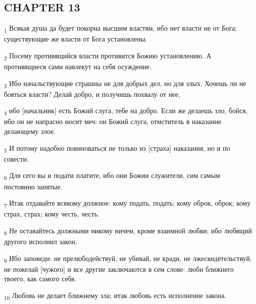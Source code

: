 \subsection{CHAPTER 13}
\begin{tcolorbox}
\textsubscript{1} Всякая душа да будет покорна высшим властям, ибо нет власти не от Бога; существующие же власти от Бога установлены.
\end{tcolorbox}
\begin{tcolorbox}
\textsubscript{2} Посему противящийся власти противится Божию установлению. А противящиеся сами навлекут на себя осуждение.
\end{tcolorbox}
\begin{tcolorbox}
\textsubscript{3} Ибо начальствующие страшны не для добрых дел, но для злых. Хочешь ли не бояться власти? Делай добро, и получишь похвалу от нее,
\end{tcolorbox}
\begin{tcolorbox}
\textsubscript{4} ибо [начальник] есть Божий слуга, тебе на добро. Если же делаешь зло, бойся, ибо он не напрасно носит меч: он Божий слуга, отмститель в наказание делающему злое.
\end{tcolorbox}
\begin{tcolorbox}
\textsubscript{5} И потому надобно повиноваться не только из [страха] наказания, но и по совести.
\end{tcolorbox}
\begin{tcolorbox}
\textsubscript{6} Для сего вы и подати платите, ибо они Божии служители, сим самым постоянно занятые.
\end{tcolorbox}
\begin{tcolorbox}
\textsubscript{7} Итак отдавайте всякому должное: кому подать, подать; кому оброк, оброк; кому страх, страх; кому честь, честь.
\end{tcolorbox}
\begin{tcolorbox}
\textsubscript{8} Не оставайтесь должными никому ничем, кроме взаимной любви; ибо любящий другого исполнил закон.
\end{tcolorbox}
\begin{tcolorbox}
\textsubscript{9} Ибо заповеди: не прелюбодействуй, не убивай, не кради, не лжесвидетельствуй, не пожелай [чужого] и все другие заключаются в сем слове: люби ближнего твоего, как самого себя.
\end{tcolorbox}
\begin{tcolorbox}
\textsubscript{10} Любовь не делает ближнему зла; итак любовь есть исполнение закона.
\end{tcolorbox}

